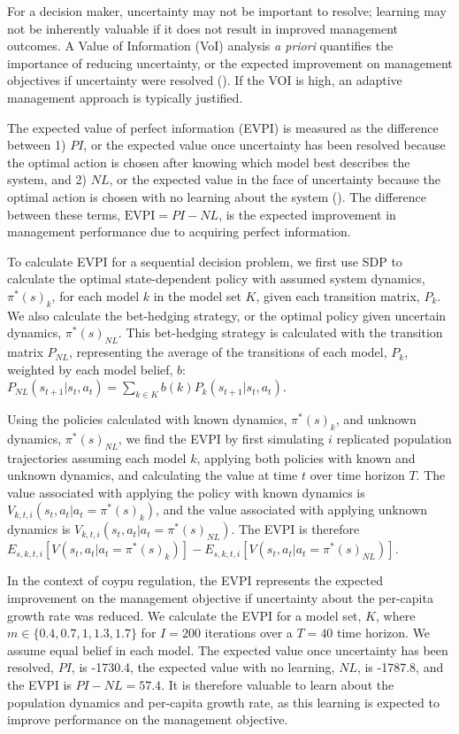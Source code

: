 \documentclass[
  11pt,
  a4paper,
]{article}
\begin{document}
For a decision maker, uncertainty may not be important to resolve; learning may not be inherently valuable if it does not result in improved management outcomes. A Value of Information (VoI) analysis \emph{a priori} quantifies the importance of reducing uncertainty, or the expected improvement on management objectives if uncertainty were resolved (). If the VOI is high, an adaptive management approach is typically justified.

The expected value of perfect information (EVPI) is measured as the difference between 1) \(PI\), or the expected value once uncertainty has been resolved because the optimal action is chosen after knowing which model best describes the system, and 2) \(NL\), or the expected value in the face of uncertainty because the optimal action is chosen with no learning about the system (). The difference between these terms, \(\text{EVPI} = PI - NL\), is the expected improvement in management performance due to acquiring perfect information.

To calculate EVPI for a sequential decision problem, we first use SDP to calculate the optimal state-dependent policy with assumed system dynamics, \(\pi^*(s)_k\), for each model \(k\) in the model set \(K\), given each transition matrix, \(P_k\). We also calculate the bet-hedging strategy, or the optimal policy given uncertain dynamics, \(\pi^*(s)_{NL}\). This bet-hedging strategy is calculated with the transition matrix \(P_{NL}\), representing the average of the transitions of each model, \(P_k\), weighted by each model belief, \(b\): \(P_{NL}(s_{t+1}|s_t, a_t) = \sum_{k\in K}b(k)P_k(s_{t+1}|s_t, a_t)\).

Using the policies calculated with known dynamics, \(\pi^*(s)_k\), and unknown dynamics, \(\pi^*(s)_{NL}\), we find the EVPI by first simulating \(i\) replicated population trajectories assuming each model \(k\), applying both policies with known and unknown dynamics, and calculating the value at time \(t\) over time horizon \(T\). The value associated with applying the policy with known dynamics is \(V_{k,t,i}(s_t, a_t | a_t = \pi^*(s)_k)\), and the value associated with applying unknown dynamics is \(V_{k,t,i}(s_t, a_t | a_t = \pi^*(s)_{NL})\). The EVPI is therefore \(E_{s,k,t,i}[V(s_t, a_t | a_t = \pi^*(s)_k)] - E_{s,k,t,i}[V(s_t, a_t | a_t = \pi^*(s)_{NL})]\).

In the context of coypu regulation, the EVPI represents the expected improvement on the management objective if uncertainty about the per-capita growth rate was reduced. We calculate the EVPI for a model set, \(K\), where \(m \in \{0.4, 0.7, 1, 1.3, 1.7\}\) for \(I = 200\) iterations over a \(T = 40\) time horizon. We assume equal belief in each model. The expected value once uncertainty has been resolved, \(PI\), is -1730.4, the expected value with no learning, \(NL\), is -1787.8, and the EVPI is \(PI - NL = 57.4\). It is therefore valuable to learn about the population dynamics and per-capita growth rate, as this learning is expected to improve performance on the management objective.
\end{document}
